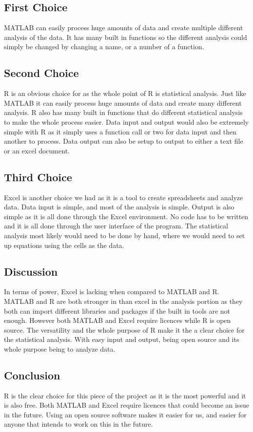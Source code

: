 \documentclass[10pt, draftclsnofoot, onecolumn]{IEEEtran}
\begin{document}
	\subsection{First Choice}
	MATLAB can easily process huge amounts of data and create multiple different analysis of the data. It has many built in functions so the different analysis could simply be changed by changing a name, or a number of a function. 
	\subsection{Second Choice}
	R is an obvious choice for as the whole point of R is statistical analysis. Just like MATLAB it can easily process huge amounts of data and create many different analysis. R also has many built in functions that do different statistical analysis to make the whole process easier. Data input and output would also be extremely simple with R as it simply uses a function call or two for data input and then another to process. Data output can also be setup to output to either a text file or an excel document.
	\subsection{Third Choice}
	Excel is another choice we had as it is a tool to create spreadsheets and analyze data. Data input is simple, and most of the analysis is simple. Output is also simple as it is all done through the Excel environment. No code has to be written and it is all done through the user interface of the program. The statistical analysis most likely would need to be done by hand, where we would need to set up equations using the cells as the data.
	\subsection{Discussion}
	In terms of power, Excel is lacking when compared to MATLAB and R. MATLAB and R are both stronger in than excel in the analysis portion as they both can import different libraries and packages if the built in tools are not enough. However both MATLAB and Excel require licences while R is open source. The versatility and the whole purpose of R make it the a clear choice for the statistical analysis. With easy input and output, being open source and its whole purpose being to analyze data.
	\subsection{Conclusion}	
	R is the clear choice for this piece of the project as it is the most powerful and it is also free. Both MATLAB and Excel require licences that could become an issue in the future. Using an open source software makes it easier for us, and easier for anyone that intends to work on this in the future.
\end{document}
